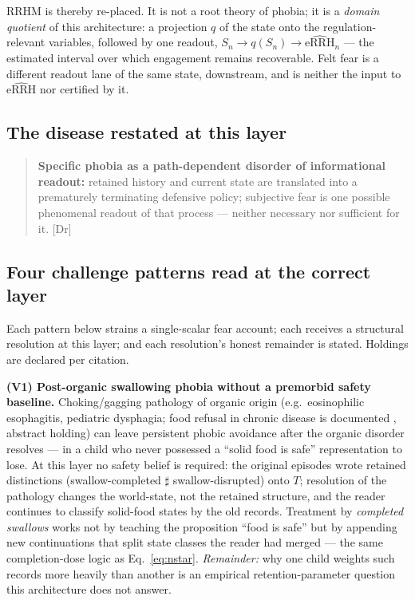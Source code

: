 \documentclass[9pt,twocolumn]{article}
\newcommand{\eRRHhat}{\widehat{\mathrm{eRRH}}}
\newcommand{\tier}[1]{{\sffamily\scriptsize\color{RRHMSlate}[#1]}}
\begin{document}
RRHM is thereby re-placed. It is not a root theory of phobia; it is a \emph{domain quotient} of this architecture: a projection $q$ of the state onto the regulation-relevant variables, followed by one readout, $S_n \to q(S_n) \to \eRRHhat_n$ --- the estimated interval over which engagement remains recoverable. Felt fear is a different readout lane of the same state, downstream, and is neither the input to $\eRRHhat$ nor certified by it.

\subsection{The disease restated at this layer}
\begin{quote}
\textbf{Specific phobia as a path-dependent disorder of informational readout:} retained history and current state are translated into a prematurely terminating defensive policy; subjective fear is one possible phenomenal readout of that process --- neither necessary nor sufficient for it. \tier{Dr}
\end{quote}

\subsection{Four challenge patterns read at the correct layer}
Each pattern below strains a single-scalar fear account; each receives a structural resolution at this layer; and each resolution's honest remainder is stated. Holdings are declared per citation.

\textbf{(V1) Post-organic swallowing phobia without a premorbid safety baseline.} Choking/gagging pathology of organic origin (e.g.\ eosinophilic esophagitis, pediatric dysphagia; food refusal in chronic disease is documented \cite{staiano2003}, abstract holding) can leave persistent phobic avoidance after the organic disorder resolves --- in a child who never possessed a ``solid food is safe'' representation to lose. At this layer no safety belief is required: the original episodes wrote retained distinctions (swallow-completed $\sharp$ swallow-disrupted) onto $T$; resolution of the pathology changes the world-state, not the retained structure, and the reader continues to classify solid-food states by the old records. Treatment by \emph{completed swallows} works not by teaching the proposition ``food is safe'' but by appending new continuations that split state classes the reader had merged --- the same completion-dose logic as Eq.~\ref{eq:nstar}. \emph{Remainder:} why one child weights such records more heavily than another is an empirical retention-parameter question this architecture does not answer.
\end{document}
